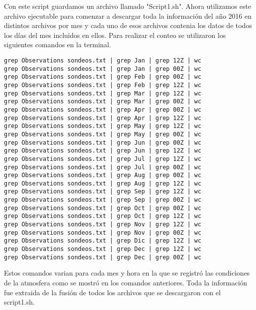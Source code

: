 \documentclass{article}
\begin{document}
Con este script guardamos un archivo llamado "Script1.sh". Ahora utilizamos este archivo ejecutable para comenzar a descargar toda la información del año 2016 en distintos archivos por mes y cada uno de esos archivos contenia los datos de todos los días del mes incluidos en ellos. Para realizar el conteo se utilizaron los siguientes comandos en la terminal.
\\
\begin{verbatim}
grep Observations sondeos.txt | grep Jan | grep 12Z | wc
grep Observations sondeos.txt | grep Jan | grep 00Z | wc
grep Observations sondeos.txt | grep Feb | grep 00Z | wc
grep Observations sondeos.txt | grep Feb | grep 12Z | wc
grep Observations sondeos.txt | grep Mar | grep 12Z | wc
grep Observations sondeos.txt | grep Mar | grep 00Z | wc
grep Observations sondeos.txt | grep Apr | grep 00Z | wc
grep Observations sondeos.txt | grep Apr | grep 12Z | wc
grep Observations sondeos.txt | grep May | grep 12Z | wc
grep Observations sondeos.txt | grep May | grep 00Z | wc
grep Observations sondeos.txt | grep Jun | grep 00Z | wc
grep Observations sondeos.txt | grep Jun | grep 12Z | wc
grep Observations sondeos.txt | grep Jul | grep 12Z | wc
grep Observations sondeos.txt | grep Jul | grep 00Z | wc
grep Observations sondeos.txt | grep Aug | grep 00Z | wc
grep Observations sondeos.txt | grep Aug | grep 12Z | wc
grep Observations sondeos.txt | grep Sep | grep 12Z | wc
grep Observations sondeos.txt | grep Sep | grep 00Z | wc
grep Observations sondeos.txt | grep Oct | grep 00Z | wc
grep Observations sondeos.txt | grep Oct | grep 12Z | wc
grep Observations sondeos.txt | grep Nov | grep 12Z | wc
grep Observations sondeos.txt | grep Nov | grep 00Z | wc
grep Observations sondeos.txt | grep Dic | grep 12Z | wc
grep Observations sondeos.txt | grep Dec | grep 12Z | wc
grep Observations sondeos.txt | grep Dec | grep 00Z | wc
\end{verbatim}
Estos comandos varian para cada mes y hora en la que se registró las
condiciones de la atmosfera como se mostró en los comandos anteriores.
Toda la información fue extraida de la fusión de todos los archivos 
que se descargaron con el script1.sh.
\end{document}
